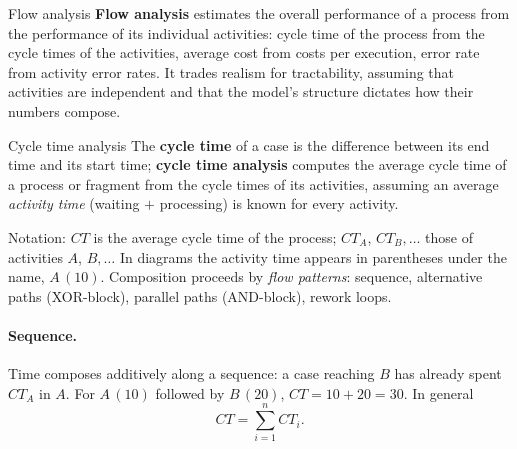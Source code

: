 \begin{definitionbox}{Flow analysis}
\textbf{Flow analysis} estimates the overall performance of a process from the performance of its individual activities: cycle time of the process from the cycle times of the activities, average cost from costs per execution, error rate from activity error rates. It trades realism for tractability, assuming that activities are independent and that the model's structure dictates how their numbers compose.
\end{definitionbox}
\begin{definitionbox}{Cycle time analysis}
The \textbf{cycle time} of a case is the difference between its end time and its start time; \textbf{cycle time analysis} computes the average cycle time of a process or fragment from the cycle times of its activities, assuming an average \emph{activity time} (waiting $+$ processing) is known for every activity.
\end{definitionbox}
Notation: $CT$ is the average cycle time of the process; $CT_A$, $CT_B, \ldots$ those of activities $A$, $B, \ldots$ In diagrams the activity time appears in parentheses under the name, $A\,(10)$. Composition proceeds by \emph{flow patterns}: sequence, alternative paths (XOR-block), parallel paths (AND-block), rework loops.

\paragraph{Sequence.} Time composes additively along a sequence: a case reaching $B$ has already spent $CT_A$ in $A$. For $A\,(10)$ followed by $B\,(20)$, $CT = 10 + 20 = 30$. In general
\[CT = \sum_{i=1}^{n} CT_i.\]

